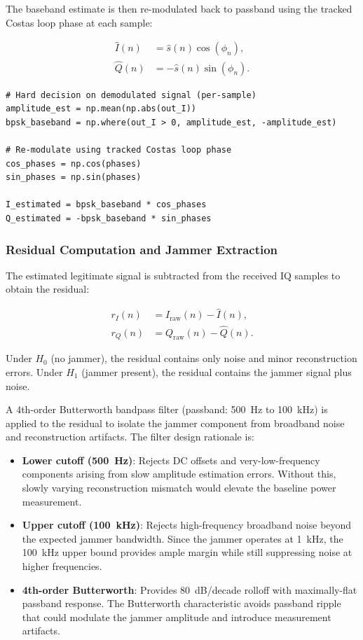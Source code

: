 \documentclass{article}
\begin{document}
The baseband estimate is then re-modulated back to passband using the tracked Costas loop phase at each sample:

\begin{align}
\hat{I}(n) &= \hat{s}(n) \cos(\phi_n), \\
\hat{Q}(n) &= -\hat{s}(n) \sin(\phi_n).
\end{align}

\begin{verbatim}
# Hard decision on demodulated signal (per-sample)
amplitude_est = np.mean(np.abs(out_I))
bpsk_baseband = np.where(out_I > 0, amplitude_est, -amplitude_est)

# Re-modulate using tracked Costas loop phase
cos_phases = np.cos(phases)
sin_phases = np.sin(phases)

I_estimated = bpsk_baseband * cos_phases
Q_estimated = -bpsk_baseband * sin_phases
\end{verbatim}

\subsubsection{Residual Computation and Jammer Extraction}

The estimated legitimate signal is subtracted from the received IQ samples to obtain the residual:

\begin{align}
r_I(n) &= I_{\text{raw}}(n) - \hat{I}(n), \\
r_Q(n) &= Q_{\text{raw}}(n) - \hat{Q}(n).
\end{align}

Under $H_0$ (no jammer), the residual contains only noise and minor reconstruction errors. Under $H_1$ (jammer present), the residual contains the jammer signal plus noise.

A 4th-order Butterworth bandpass filter (passband: 500~Hz to 100~kHz) is applied to the residual to isolate the jammer component from broadband noise and reconstruction artifacts. The filter design rationale is:

\begin{itemize}
\item \textbf{Lower cutoff (500~Hz)}: Rejects DC offsets and very-low-frequency components arising from slow amplitude estimation errors. Without this, slowly varying reconstruction mismatch would elevate the baseline power measurement.
\item \textbf{Upper cutoff (100~kHz)}: Rejects high-frequency broadband noise beyond the expected jammer bandwidth. Since the jammer operates at 1~kHz, the 100~kHz upper bound provides ample margin while still suppressing noise at higher frequencies.
\item \textbf{4th-order Butterworth}: Provides 80~dB/decade rolloff with maximally-flat passband response. The Butterworth characteristic avoids passband ripple that could modulate the jammer amplitude and introduce measurement artifacts.
\end{itemize}
\end{document}
